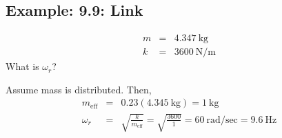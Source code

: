 \documentclass[]{article}
\begin{document}
\begin{figure}[h!]
\begin{tikzpicture}
	\end{tikzpicture}
\end{figure}
\subsection{Example: 9.9: Link}
\begin{eqnarray}
	m & = & 4.347\ \text{kg} \nonumber \\
	k & = & 3600\ \text{N/m} \nonumber
\end{eqnarray}
What is $\omega_{r}$?

\noindent
Assume mass is distributed. Then,
\begin{eqnarray}
	m_{\text{eff}} & = & 0.23(4.345\ \text{kg}) = 1\ \text{kg} \nonumber \\
	\omega_{r} & = & \sqrt{\frac{k}{m_{\text{eff}}}} = \sqrt{\frac{3600}{1}} = 60\ \text{rad/sec} = 9.6\ \text{Hz} \nonumber
\end{eqnarray}
\end{document}
